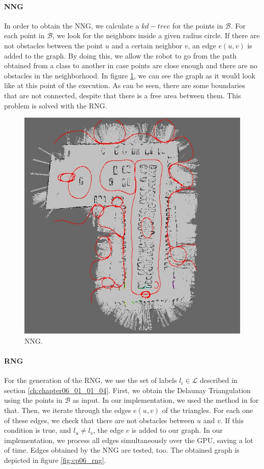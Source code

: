 \paragraph{\acf{NNG}}\label{ch:chapter06_01_01_05_01}

In order to obtain the \ac{NNG}, we calculate a $kd-tree$ for the points in $\mathcal{B}$. For each point in $\mathcal{B}$, we look for the neighbors inside a given radius circle. If there are not obstacles between the point $u$ and a certain neighbor $v$, an edge $e(u,v)$ is added to the graph. By doing this, we allow the robot to go from the path obtained from a class to another in case points are close enough and there are no obstacles in the neighborhood. In figure \ref{fig:cp06_nng}, we can see the graph as it would look like at this point of the execution. As can be seen, there are some boundaries that are not connected, despite that there is a free area between them. This problem is solved with the \acf{RNG}.

\begin{figure}[h!]
  \centering
  \includegraphics[width=\textwidth, height=0.75\textwidth]{figure3}
  \caption{\acf{NNG}.}
  \label{fig:cp06_nng}
\end{figure}

\paragraph{\acf{RNG}}\label{ch:chapter06_01_01_05_02}

For the generation of the \ac{RNG}, we use the set of labels $l_i \in \mathcal{L}$ described in section \ref{ch:chapter06_01_01_04}. First, we obtain the Delaunay Triangulation \citep{su1997comparison} using the points in $\mathcal{B}$ as input. In our implementation, we used the method in \cite{rong2008computing} for that. Then, we iterate through the edges $e(u,v)$ of the triangles. For each one of these edges, we check that there are not obstacles between $u$ and $v$. If this condition is true, and $l_u \neq l_v$, the edge $e$ is added to our graph. In our implementation, we process all edges simultaneously over the \acs{GPU}, saving a lot of time. Edges obtained by the \ac{NNG} are tested, too. The obtained graph is depicted in figure \ref{fig:cp06_rng}.

